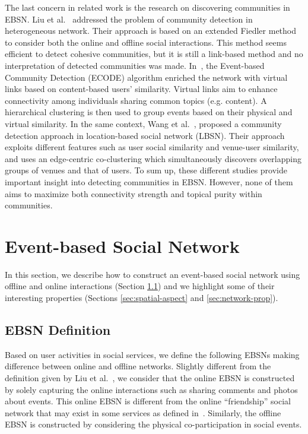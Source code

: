 The last concern in related work is the research on discovering communities in EBSN. Liu et al.~\cite{Liu:KDD12} addressed the problem of community detection in heterogeneous network. Their approach is based on an extended Fiedler method to consider both the online and offline social interactions. This method seems efficient to detect cohesive communities, but it is still a link-based method and no interpretation of detected communities was made. In~\cite{Li:dasfa11a}, the Event-based Community Detection (ECODE) algorithm enriched the network with virtual links based on content-based users' similarity. Virtual links aim to enhance connectivity among individuals sharing common topics (e.g. content). A hierarchical clustering is then used to group events based on their physical and virtual similarity. In the same context, Wang et al.~\cite{Wang:14}, proposed a community detection approach in location-based social network (LBSN). Their approach exploits different features such as user social similarity and venue-user similarity, and uses an edge-centric co-clustering which simultaneously discovers overlapping groups of venues and that of users. To sum up, these different studies provide important insight into detecting communities in EBSN. However, none of them aims to maximize both connectivity strength and topical purity within communities.


\section{Event-based Social Network} \label{sec:esbn}
In this section, we describe how to construct an event-based social network using offline and online interactions (Section \ref{sec:esbn-def}) and we highlight some of their interesting properties (Sections \ref{sec:spatial-aspect} and \ref{sec:network-prop}).

\subsection{EBSN Definition}   \label{sec:esbn-def}

Based on user activities in social services, we define the following EBSNs making difference between online and offline networks. Slightly different from the definition given by Liu et al.~\cite{Liu:KDD12}, we consider that the online EBSN is constructed by solely capturing the online interactions such as sharing comments and photos about events. This online EBSN is different from the online ``friendship'' social network that may exist in some services as defined in~\cite{Liu:KDD12}. Similarly, the offline EBSN is constructed by considering the physical co-participation in social events.

